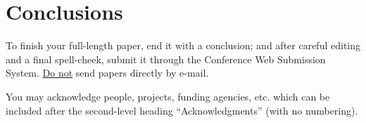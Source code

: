 \documentclass{article}
\begin{document}
\section{Conclusions}
To finish your full-length paper, end it with a conclusion;
and after careful editing and a final spell-cheek,
submit it through the Conference Web Submission System.
\underline{Do not} send papers directly by e-mail.
%
\begin{acknowledgments}
You may acknowledge people, projects,
funding agencies, etc.
which can be included after the second-level heading
``Acknowledgments'' (with no numbering).
\end{acknowledgments}


\end{document}
